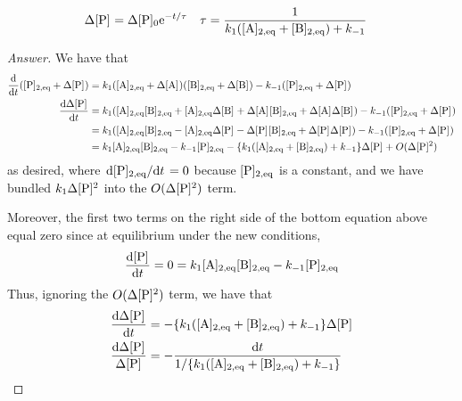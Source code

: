 \documentclass[../psets.tex]{subfiles}
\begin{document}
\begin{enumerate}[label={\textbf{28-\arabic*.}},leftmargin=3.5em]
    \begin{align*}
        \Delta\cnc{P} &= \Delta\cnc[0]{P}\e[-t/\tau]&
        \tau &= \frac{1}{k_1(\cnc[2,eq]{A}+\cnc[2,eq]{B})+k_{-1}}
    \end{align*}
    \begin{proof}[Answer]
        We have that
        \begin{align*}
            \dv{t}(\cnc[2,eq]{P}+\Delta\cnc{P}) &= k_1(\cnc[2,eq]{A}+\Delta\cnc{A})(\cnc[2,eq]{B}+\Delta\cnc{B})-k_{-1}(\cnc[2,eq]{P}+\Delta\cnc{P})\\
            \dv{\Delta\cnc{P}}{t} &= k_1(\cnc[2,eq]{A}\cnc[2,eq]{B}+\cnc[2,eq]{A}\Delta\cnc{B}+\Delta\cnc{A}\cnc[2,eq]{B}+\Delta\cnc{A}\Delta\cnc{B})-k_{-1}(\cnc[2,eq]{P}+\Delta\cnc{P})\\
            &= k_1(\cnc[2,eq]{A}\cnc[2,eq]{B}-\cnc[2,eq]{A}\Delta\cnc{P}-\Delta\cnc{P}\cnc[2,eq]{B}+\Delta\cnc{P}\Delta\cnc{P})-k_{-1}(\cnc[2,eq]{P}+\Delta\cnc{P})\\
            &= k_1\cnc[2,eq]{A}\cnc[2,eq]{B}-k_{-1}\cnc[2,eq]{P}-\{k_1(\cnc[2,eq]{A}+\cnc[2,eq]{B})+k_{-1}\}\Delta\cnc{P}+O(\Delta\cnc{P}^2)
        \end{align*}
        as desired, where $\dv*{\cnc[2,eq]{P}}{t}=0$ because $\cnc[2,eq]{P}$ is a constant, and we have bundled $k_1\Delta\cnc{P}^2$ into the $O(\Delta\cnc{P}^2)$ term.\par
        Moreover, the first two terms on the right side of the bottom equation above equal zero since at equilibrium under the new conditions,
        \begin{equation*}
            \dv{\cnc{P}}{t} = 0
            = k_1\cnc[2,eq]{A}\cnc[2,eq]{B}-k_{-1}\cnc[2,eq]{P}
        \end{equation*}
        Thus, ignoring the $O(\Delta\cnc{P}^2)$ term, we have that
        \begin{align*}
            \dv{\Delta\cnc{P}}{t} &= -\{k_1(\cnc[2,eq]{A}+\cnc[2,eq]{B})+k_{-1}\}\Delta\cnc{P}\\
            \frac{\dd{\Delta\cnc{P}}}{\Delta\cnc{P}} &= -\frac{\dd{t}}{1/\{k_1(\cnc[2,eq]{A}+\cnc[2,eq]{B})+k_{-1}\}}\\

\end{align*}
\end{proof}
\end{enumerate}
\end{document}
